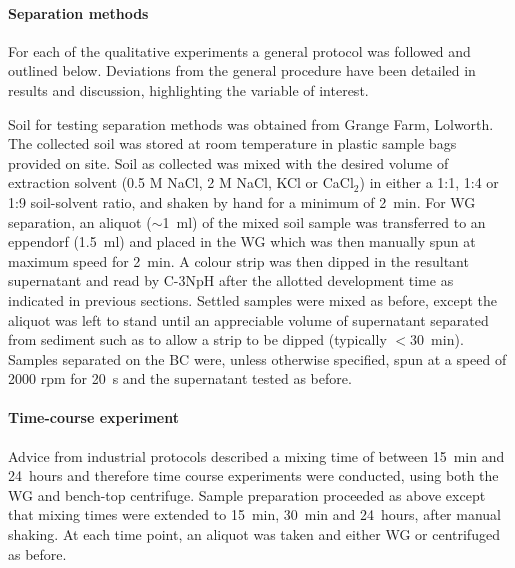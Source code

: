 \paragraph{Separation methods}

For each of the qualitative experiments a general protocol was followed and outlined below. Deviations from the general procedure have been detailed in results and discussion, highlighting the variable of interest.

Soil for testing separation methods was obtained from Grange Farm, Lolworth. %
The collected soil was stored at room temperature in plastic sample bags provided on site. Soil as collected was mixed with the desired volume of extraction solvent (0.5 M NaCl, 2 M NaCl, KCl or CaCl$_2$) in either a 1:1, 1:4 or 1:9 soil-solvent ratio, and shaken by hand for a minimum of \SI{2}{\minute}. For WG separation, an aliquot ($\sim$\SI{1}{\ml}) of the mixed soil sample was transferred to an eppendorf (\SI{1.5}{\ml}) and placed in the WG which was then manually spun at maximum speed for \SI{2}{\minute}. A colour strip was then dipped in the resultant supernatant and read by C-3NpH after the allotted development time as indicated in previous sections. Settled samples were mixed as before, except the aliquot was left to stand until an appreciable volume of supernatant separated from sediment such as to allow a strip to be dipped (typically $<$\SI{30}{\minute}). Samples separated on the \acrfull{BC} were, unless otherwise specified, spun at a speed of 2000 rpm for \SI{20}{s} and the supernatant tested as before.

\paragraph{Time-course experiment} \label{c3nph:mixing}

Advice from industrial protocols described a mixing time of between \SI{15}{\minute} and \SI{24}{hours} and therefore time course experiments were conducted, using both the WG and bench-top centrifuge. Sample preparation proceeded as above except that mixing times were extended to \SI{15}{\minute}, \SI{30}{\minute} and \SI{24}{hours}, after manual shaking. At each time point, an aliquot was taken and either WG or centrifuged as before.

